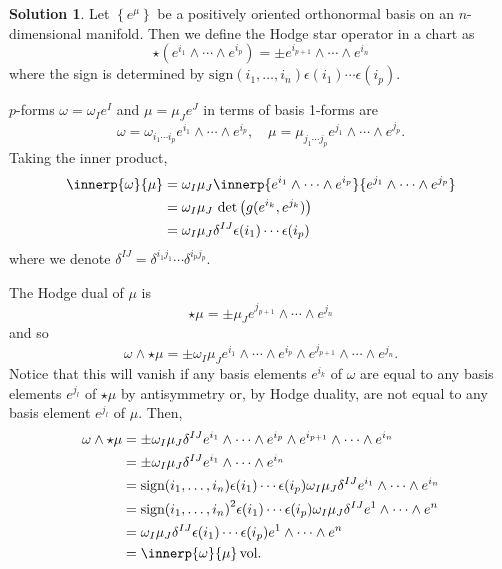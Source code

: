 \documentclass[11pt, a4paper]{article}
\theoremstyle{definition}
\newtheorem{sol}{Solution}[part]
\begin{document}
\begin{sol}

Let $\left\{e^\mu\right\}$ be a positively oriented orthonormal basis on an $n$-dimensional manifold. Then we define the Hodge star operator in a chart as
\[
    \star (e^{i_1} \wedge \cdots \wedge e^{i_p}) = \pm e^{i_{p + 1}} \wedge \cdots \wedge e^{i_n}
\]
where the sign is determined by $\text{sign}(i_1, \ldots, i_n) \epsilon(i_1) \cdots \epsilon(i_p)$.

$p$-forms $\omega = \omega_I e^I$ and $\mu = \mu_J e^J$ in terms of basis 1-forms are
\[
    \omega = \omega_{i_1 \cdots i_p} e^{i_1} \wedge \cdots \wedge e^{i_p}, \quad
    \mu = \mu_{j_1 \cdots j_p} e^{j_1} \wedge \cdots \wedge e^{j_p}.
\]
Taking the inner product,
\begin{align*}
    \innerp{\omega}{\mu} &= \omega_I \mu_J \innerp{e^{i_1} \wedge \cdots \wedge e^{i_p}}{e^{j_1} \wedge \cdots \wedge e^{j_p}} \\
        &= \omega_I \mu_J \, \det \big(g(e^{i_k}, e^{j_k})\big) \\
        &= \omega_I \mu_J \delta^{IJ} \epsilon(i_1) \cdots \epsilon(i_p)
\end{align*}
where we denote $\delta^{IJ} = \delta^{i_1 j_1} \cdots \delta^{i_p j_p}$.

The Hodge dual of $\mu$ is
\[
    \star \mu = \pm \mu_J e^{j_{p + 1}} \wedge \cdots \wedge e^{j_n}
\]
and so
\[
    \omega \wedge \star \mu = \pm \omega_I \mu_J e^{i_1} \wedge \cdots \wedge e^{i_p} \wedge e^{j_{p + 1}} \wedge \cdots \wedge e^{j_n}.
\]
Notice that this will vanish if any basis elements $e^{i_k}$ of $\omega$ are equal to any basis elements $e^{j_l}$ of $\star \mu$ by antisymmetry or, by Hodge duality, are not equal to any basis element $e^{j_l}$ of $\mu$.
Then,
\begin{align*}
    \omega \wedge \star \mu &= \pm \omega_I \mu_J \delta^{IJ} e^{i_1} \wedge \cdots \wedge e^{i_p} \wedge e^{i_{p + 1}} \wedge \cdots \wedge e^{i_n} \\
        &= \pm \omega_I \mu_J \delta^{IJ} e^{i_1} \wedge \cdots \wedge e^{i_n} \\
        &= \text{sign}(i_1, \ldots, i_n) \epsilon(i_1) \cdots \epsilon(i_p) \omega_I \mu_J \delta^{IJ} e^{i_1} \wedge \cdots \wedge e^{i_n} \\
        &= {\text{sign}(i_1, \ldots, i_n)}^2 \epsilon(i_1) \cdots \epsilon(i_p) \omega_I \mu_J \delta^{IJ} e^1 \wedge \cdots \wedge e^n \\
        &= \omega_I \mu_J \delta^{IJ} \epsilon(i_1) \cdots \epsilon(i_p) e^1 \wedge \cdots \wedge e^n \\
        &= \innerp{\omega}{\mu} \, \text{vol}.
\end{align*}

\end{sol}
\end{document}
